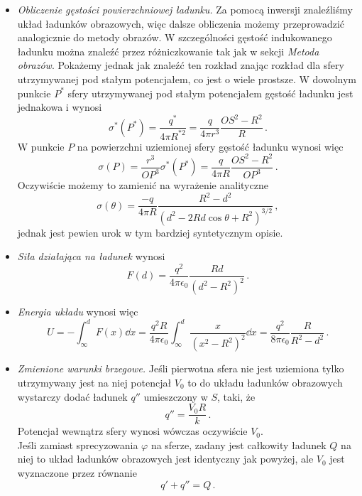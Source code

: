 \documentclass[../main.tex]{subfiles}
\begin{document}
\begin{enumerate}
\begin{itemize}
        \item\textit{Obliczenie gęstości powierzchniowej ładunku.} Za pomocą inwersji znaleźliśmy
        układ ładunków obrazowych, więc dalsze obliczenia możemy przeprowadzić analogicznie do
        metody obrazów. W szczególności gęstość indukowanego ładunku można znaleźć przez
        różniczkowanie tak jak w sekcji \textit{Metoda obrazów}. Pokażemy jednak jak znaleźć ten
        rozkład znając rozkład dla sfery utrzymywanej pod stałym potencjałem, co jest o wiele
        prostsze. W dowolnym punkcie \(P^*\) sfery utrzymywanej pod stałym potencjałem gęstość
        ładunku jest jednakowa i wynosi
        \begin{equation*}
            \sigma^*(P^*)=\frac{q^*}{4\pi R^{*2}}=\frac{q}{4\pi r^3}\frac{OS^2-R^2}{R}\,.
        \end{equation*}
        W punkcie \(P\) na powierzchni uziemionej sfery gęstość ładunku wynosi więc
        \begin{equation*}
            \sigma(P)=\frac{r^3}{OP^3}\sigma^*(P^*)=\frac{q}{4\pi R}\frac{OS^2-R^2}{OP^3}\,.
        \end{equation*}
        Oczywiście możemy to zamienić na wyrażenie analityczne
        \begin{equation*}
            \sigma(\theta)=\frac{-q}{4\pi R}\frac{R^2-d^2}{(d^2-2Rd\cos\theta+R^2)^{3/2}}\,,
        \end{equation*}
        jednak jest pewien urok w tym bardziej syntetycznym opisie.
        \item \textit{Siła działająca na ładunek} wynosi
        \begin{equation*}
            F(d)=\frac{q^2}{4\pi\epsilon_0}\frac{Rd}{(d^2-R^2)^2}\,.
        \end{equation*}
        \item \textit{Energia układu} wynosi więc
        \begin{equation*}
            U=-\int_\infty^d F(x)\dd{x}=\frac{q^2R}{4\pi\epsilon_0}\int_\infty^d\frac{x}{(x^2-R^2)^2}\dd{x}=\frac{q^2}{8\pi\epsilon_0}\frac{R}{R^2-d^2}\,.
        \end{equation*}
        \item \textit{Zmienione warunki brzegowe.} Jeśli pierwotna  sfera nie jest uziemiona tylko
        utrzymywany jest na niej potencjał \(V_0\) to do układu ładunków obrazowych wystarczy dodać
        ładunek \(q''\) umieszczony w \(S\), taki, że
        \begin{equation*}
            q''=\frac{V_0R}{k}\,.
        \end{equation*}
        Potencjał wewnątrz sfery wynosi wówczas oczywiście \(V_0\).\\
        Jeśli zamiast sprecyzowania \(\varphi\) na sferze, zadany jest całkowity ładunek \(Q\) na
        niej to układ ładunków obrazowych jest identyczny jak powyżej, ale \(V_0\) jest wyznaczone
        przez równanie
        \begin{equation*}
            q'+q''=Q\,.
        \end{equation*}
    \end{itemize}
    

\end{enumerate}
\end{document}
